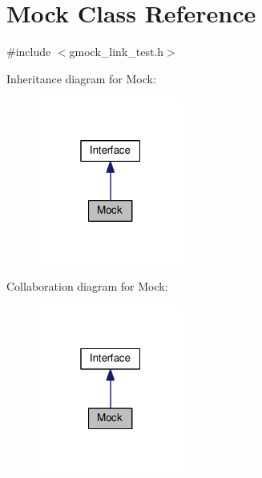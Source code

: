\hypertarget{classMock}{}\section{Mock Class Reference}
\label{classMock}


{\ttfamily \#include $<$gmock\+\_\+link\+\_\+test.\+h$>$}



Inheritance diagram for Mock\+:
\nopagebreak
\begin{figure}[H]
\begin{center}
\leavevmode
\includegraphics[width=135pt]{classMock__inherit__graph}
\end{center}
\end{figure}


Collaboration diagram for Mock\+:
\nopagebreak
\begin{figure}[H]
\begin{center}
\leavevmode
\includegraphics[width=135pt]{classMock__coll__graph}
\end{center}
\end{figure}
